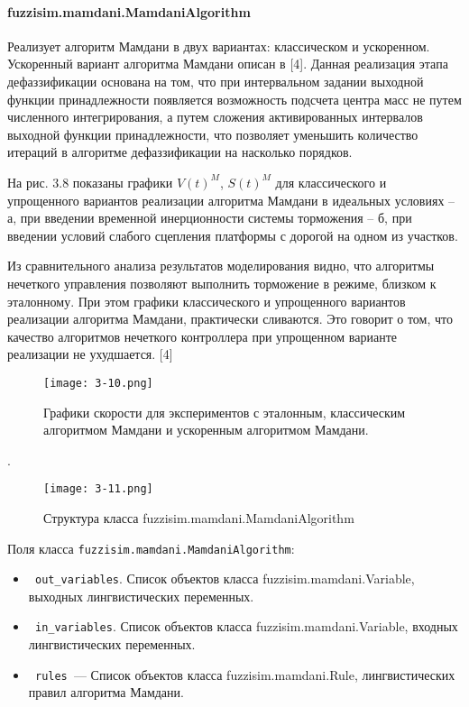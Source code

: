 \paragraph{fuzzisim.mamdani.MamdaniAlgorithm}

Реализует алгоритм Мамдани в двух вариантах: классическом и ускоренном. Ускоренный вариант алгоритма Мамдани описан в [4]. Данная реализация этапа дефаззификации основана на том, что при интервальном задании выходной функции принадлежности появляется возможность подсчета центра масс не путем численного интегрирования, а путем сложения активированных интервалов выходной функции принадлежности, что позволяет уменьшить количество итераций в алгоритме дефаззификации на насколько порядков.

На рис. 3.8 показаны графики $V(t)^M$, $S(t)^M$ для классического и упрощенного вариантов реализации  алгоритма Мамдани в идеальных условиях – а, при введении временной инерционности системы торможения – б, при введении условий слабого сцепления платформы с дорогой на одном из участков.

Из сравнительного анализа результатов моделирования  видно, что алгоритмы нечеткого управления позволяют выполнить торможение в режиме, близком к эталонному. При этом графики классического и упрощенного вариантов реализации алгоритма Мамдани,
практически сливаются. Это говорит о том, что качество алгоритмов нечеткого контроллера при упрощенном варианте реализации не ухудшается. [4]

\begin{figure}[ht]
	\centering
	\texttt{[image: 3-10.png]}
	\caption{ Графики скорости для экспериментов с эталонным, классическим алгоритмом Мамдани и ускоренным алгоритмом Мамдани. }
\end{figure}

.

\begin{figure}[ht]
	\centering
	\texttt{[image: 3-11.png]}
	\caption{ Структура класса fuzzisim.mamdani.MamdaniAlgorithm}
\end{figure}

Поля класса \lstinline!fuzzisim.mamdani.MamdaniAlgorithm!:
\begin{itemize}
	\item \lstinline! out_variables!. Список объектов класса fuzzisim.mamdani.Variable, выходных лингвистических переменных.
	\item \lstinline! in_variables!.  Список объектов класса fuzzisim.mamdani.Variable, входных лингвистических переменных.
	\item \lstinline! rules !— Список объектов класса fuzzisim.mamdani.Rule, лингвистических правил алгоритма Мамдани.
\end{itemize}


